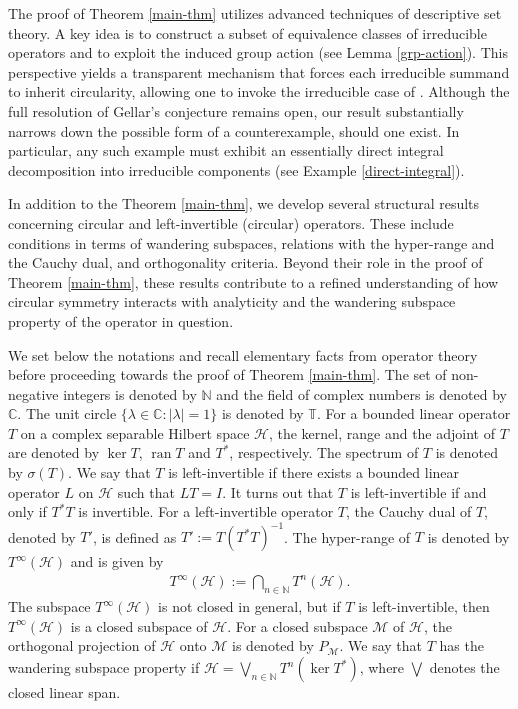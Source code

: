 \documentclass[a4paper,oneside,10pt, reqno]{amsproc}
\theoremstyle{remark}
\theoremstyle{definition}
\newcommand{\beqn}{\begin{eqnarray*}}
\newcommand{\eeqn}{\end{eqnarray*}}
\begin{document}
The proof of Theorem \ref{main-thm} utilizes advanced techniques of descriptive set theory. A key idea is to construct a subset of equivalence classes of irreducible operators and to exploit the induced group action (see Lemma \ref{grp-action}). This perspective yields a transparent mechanism that forces each irreducible summand to inherit circularity, allowing one to invoke the irreducible case of \cite{AHHK}. Although the full resolution of Gellar’s conjecture remains open, our result substantially narrows down the possible form of a counterexample, should one exist. In particular, any such example must exhibit an essentially direct integral decomposition into irreducible components (see Example \ref{direct-integral}). 


In addition to the Theorem \ref{main-thm}, we develop several structural results concerning circular and left-invertible (circular) operators. These include conditions in terms of wandering subspaces, relations with the hyper-range and the Cauchy dual, and orthogonality criteria. Beyond their role in the proof of Theorem \ref{main-thm}, these results contribute to a refined understanding of how circular symmetry interacts with analyticity and the wandering subspace property of the operator in question.

We set below the notations and recall elementary facts from operator theory before proceeding towards the proof of Theorem \ref{main-thm}. The set of non-negative integers is denoted by $\mathbb N$ and the field of complex numbers is denoted by $\mathbb C$. The unit circle $\{\lambda \in \mathbb C : |\lambda| = 1\}$ is denoted by $\mathbb T$.
For a bounded linear operator $T$ on a complex separable Hilbert space $\mathcal H$, the kernel, range and the adjoint of $T$ are denoted by $\ker T$, $\operatorname{ran} T$ and $T^*$, respectively. The spectrum of $T$ is denoted by $\sigma(T)$. We say that $T$ is left-invertible if there exists a bounded linear operator $L$ on $\mathcal H$ such that $LT=I$. It turns out that $T$ is left-invertible if and only if $T^*T$ is invertible. For a left-invertible operator $T$, the Cauchy dual of $T$, denoted by $T'$, is defined as $T' := T(T^*T)^{-1}$. The hyper-range of $T$
is denoted by $T^\infty(\mathcal H)$ and is given by
\beqn
T^\infty(\mathcal H) := \bigcap_{n \in \mathbb N} T^n(\mathcal H).
\eeqn
The subspace $T^\infty(\mathcal H)$ is not closed in general, but if $T$ is left-invertible, then $T^\infty(\mathcal H)$ is a closed subspace of $\mathcal H$. For a closed subspace $\mathcal M$ of $\mathcal H$, the orthogonal projection of $\mathcal H$ onto $\mathcal M$ is denoted by $P_{\mathcal M}$. We say that $T$ has the wandering subspace property if $\mathcal H = \bigvee_{n \in \mathbb N} T^n(\ker T^*)$, where $\bigvee$ denotes the closed linear span.
\end{document}
